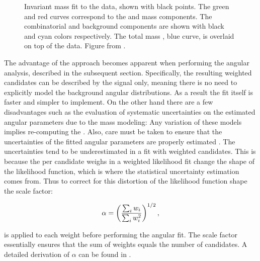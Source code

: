 \begin{figure}[t]
  \centering
  \scalebox{0.5}{}
  \caption{Invariant mass fit to the data, shown with black points. The green and red curves correspond to the \BdJpsiKpi and
           \BsJpsiKpi mass \pdf components. The combinatorial and \LbJpsippi background components are shown with black and cyan
           colors respectively. The total mass \pdf, blue curve, is overlaid on top of the data. Figure from \cite{bsjpsikst-paper}. }
  \label{mass_plot}
\end{figure}

The advantage of the \sWeights approach becomes apparent when performing the angular analysis, described in the subsequent section.
Specifically, the resulting weighted candidates can be described by the signal \pdf only, meaning there is no need to explicitly model
the background angular distributions. As a result the fit itself is faster and simpler to implement. On the other hand there are a few
disadvantages such as the evaluation of systematic uncertainties on the estimated angular parameters due to the mass \pdf modeling:
Any variation of these models implies re-computing the \sWeights. Also, care must be taken to ensure that the uncertainties
of the fitted angular parameters are properly estimated \cite{splot}. The uncertainties tend to be underestimated in a fit
with weighted candidates. This is because the per candidate weighs in a weighted likelihood fit change the shape of the
likelihood function, which is where the statistical uncertainty estimation comes from.
Thus to correct for this distortion of the likelihood function shape the scale factor:

\begin{equation}
  \centering
  \alpha = \left(\frac{\sum_{i} w_i}{\sum_{i} w_i^2}\right)^{1/2},
  \label{sWeights_scale_factor}
\end{equation}

\noindent is applied to each weight before performing the angular fit. The scale factor essentially ensures that the sum of weights
equals the number of candidates. A detailed derivation of $\alpha$ can be found in \cite{jeroenThesis}.
